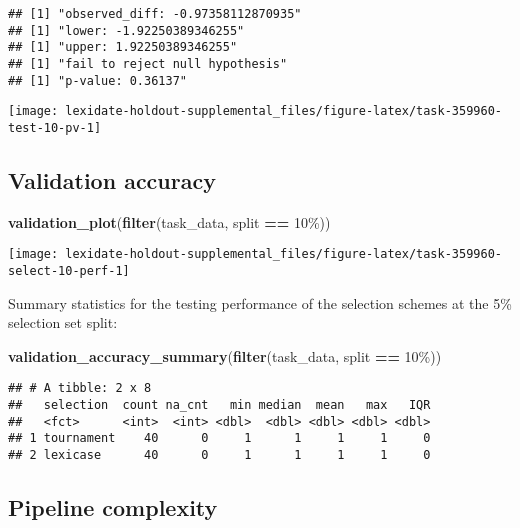 \documentclass[
]{book}
\newenvironment{Shaded}{\begin{snugshade}}{\end{snugshade}}
\newcommand{\FunctionTok}[1]{\textcolor[rgb]{0.13,0.29,0.53}{\textbf{#1}}}
\newcommand{\NormalTok}[1]{#1}
\newcommand{\SpecialCharTok}[1]{\textcolor[rgb]{0.81,0.36,0.00}{\textbf{#1}}}
\newcommand{\StringTok}[1]{\textcolor[rgb]{0.31,0.60,0.02}{#1}}
\begin{document}
\begin{verbatim}
## [1] "observed_diff: -0.97358112870935"
## [1] "lower: -1.92250389346255"
## [1] "upper: 1.92250389346255"
## [1] "fail to reject null hypothesis"
## [1] "p-value: 0.36137"
\end{verbatim}

\texttt{[image: lexidate-holdout-supplemental\_files/figure-latex/task-359960-test-10-pv-1]}

\hypertarget{validation-accuracy-46}{%
\subsection{Validation accuracy}\label{validation-accuracy-46}}

\begin{Shaded}
\begin{Highlighting}[]
\FunctionTok{validation\_plot}\NormalTok{(}\FunctionTok{filter}\NormalTok{(task\_data, split }\SpecialCharTok{==} \StringTok{\textquotesingle{}10\%\textquotesingle{}}\NormalTok{))}
\end{Highlighting}
\end{Shaded}

\texttt{[image: lexidate-holdout-supplemental\_files/figure-latex/task-359960-select-10-perf-1]}

Summary statistics for the testing performance of the selection schemes at the 5\% selection set split:

\begin{Shaded}
\begin{Highlighting}[]
\FunctionTok{validation\_accuracy\_summary}\NormalTok{(}\FunctionTok{filter}\NormalTok{(task\_data, split }\SpecialCharTok{==} \StringTok{\textquotesingle{}10\%\textquotesingle{}}\NormalTok{))}
\end{Highlighting}
\end{Shaded}

\begin{verbatim}
## # A tibble: 2 x 8
##   selection  count na_cnt   min median  mean   max   IQR
##   <fct>      <int>  <int> <dbl>  <dbl> <dbl> <dbl> <dbl>
## 1 tournament    40      0     1      1     1     1     0
## 2 lexicase      40      0     1      1     1     1     0
\end{verbatim}

\hypertarget{pipeline-complexity-44}{%
\subsection{Pipeline complexity}\label{pipeline-complexity-44}}
\end{document}
